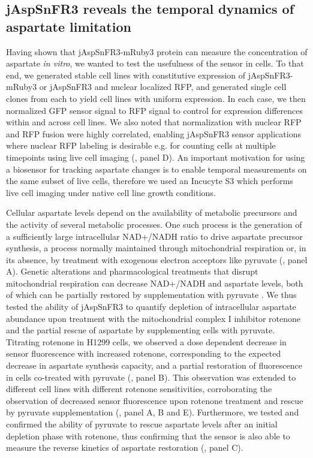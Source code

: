 \documentclass[9pt,lineno]{elife}
\begin{document}
\subsection{jAspSnFR3 reveals the temporal dynamics of aspartate limitation}
Having shown that jAspSnFR3-mRuby3 protein can measure the concentration of aspartate \textit{in vitro}, we wanted to test the usefulness of the sensor in cells.
To that end, we generated stable cell lines with constitutive expression of jAspSnFR3-mRuby3 or jAspSnFR3 and nuclear localized RFP, and generated single cell clones from each to yield cell lines with uniform expression.
In each case, we then normalized GFP sensor signal to RFP signal to control for expression differences within and across cell lines.
We also noted that normalization with nuclear RFP and RFP fusion were highly correlated, enabling jAspSnFR3 sensor applications where nuclear RFP labeling is desirable e.g. for counting cells at multiple timepoints using live cell imaging (, panel D).
An important motivation for using a biosensor for tracking aspartate changes is to enable temporal measurements on the same subset of live cells, therefore we used an Incucyte S3 which performs live cell imaging under native cell line growth conditions.

Cellular aspartate levels depend on the availability of metabolic precursors and the activity of several metabolic processes.
One such process is the generation of a sufficiently large intracellular NAD+/NADH ratio to drive aspartate precursor synthesis, a process normally maintained through mitochondrial respiration or, in its absence, by treatment with exogenous electron acceptors like pyruvate (, panel A).
Genetic alterations and pharmacological treatments that disrupt mitochondrial respiration can decrease NAD+/NADH and aspartate levels, both of which can be partially restored by supplementation with pyruvate \citep{Sullivan2015-xf, Birsoy2015-pg}.
We thus tested the ability of jAspSnFR3 to quantify depletion of intracellular aspartate abundance upon treatment with the mitochondrial complex I inhibitor rotenone and the partial rescue of aspartate by supplementing cells with pyruvate.
Titrating rotenone in H1299 cells, we observed a dose dependent decrease in sensor fluorescence with increased rotenone, corresponding to the expected decrease in aspartate synthesis capacity, and a partial restoration of fluorescence in cells co-treated with pyruvate (, panel B).
This observation was extended to different cell lines with different rotenone sensitivities, corroborating the observation of decreased sensor fluorescence upon rotenone treatment and rescue by pyruvate supplementation (, panel A, B and E).
Furthermore, we tested and confirmed the ability of pyruvate to rescue aspartate levels after an initial depletion phase with rotenone, thus confirming that the sensor is also able to measure the reverse kinetics of aspartate restoration (, panel C).
\end{document}
